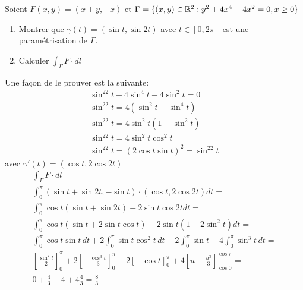 \begin{myExample}
	Soient $F(x,y)=(x+y,-x)$ et $\Gamma=\{(x,y)\in\mathbb{R}^2:y^2+4x^4-4x^2=0,x\geq0\}$
	\begin{enumerate}
		\item Montrer que $\gamma(t)=(\sin t, \sin 2t)$ avec $t\in[0,2\pi]$ est une paramétrisation de $\Gamma$.
		\item Calculer $\int_\Gamma F\cdot dl$
	\end{enumerate}
	Une façon de le prouver est la suivante:
	\begin{eqnarray*}
		\sin^22t+4\sin^4t-4\sin^2t=0
		\\
		\sin^22t=4(\sin^2t-\sin^4t)
		\\
		\sin^22t=4\sin^2t(1-\sin^2t)
		\\
		\sin^22t=4\sin^2t\cos^2t
		\\
		\sin^22t=(2\cos t\sin t)^2=\sin^22t
	\end{eqnarray*}
	avec $\gamma'(t)=(\cos t,2\cos 2t)$
	\begin{eqnarray*}
		\int_\Gamma F\cdot dl=
		\\
		\int_{0}^{\pi}(\sin t+\sin2t,-\sin t)\cdot(\cos t,2\cos 2t)dt=
		\\
		\int_{0}^{\pi}\cos t(\sin t+\sin 2t)-2\sin t\cos 2tdt=
		\\
		\int_{0}^{\pi}\cos t(\sin t+2\sin t\cos t)-2\sin t(1-2\sin^2t)dt=
		\\
		\int_{0}^{\pi}\cos t\sin t\,dt+2\int_0^{\pi}\sin t\cos^2t\,dt-2\int_0^\pi\sin t+4\int_0^\pi \sin^3t\,dt=
		\\
		\left[\frac{\sin^2t}{2}\right]_0^{\pi}+2\left[-\frac{\cos^3t}{3}\right]_0^{\pi}-2\left[-\cos t\right]_0^\pi+4\left[u+\frac{u^3}{3}\right]_{\cos 0}^{\cos \pi}=
		\\
		0 + \frac{4}{3} - 4 + 4\frac{4}{3} = \frac{8}{3} 
	\end{eqnarray*}
\end{myExample}

